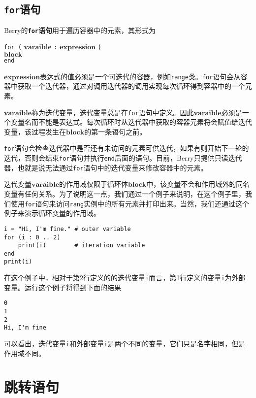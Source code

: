 \subsection{\texttt{for}语句}

Berry的\textbf{\texttt{for}语句}用于遍历容器中的元素，其形式为
\begin{algorithm}
    \texttt{for (} $\bm{varaible}$ \texttt{:} $\bm{expression}$ \texttt{)} \\
        \qquad $\bm{block}$ \\
    \texttt{end}
\end{algorithm}\vspace{-0.6em}

$\bm{expression}$表达式的值必须是一个可迭代的容器，例如\texttt{range}类。\texttt{for}语句会从容器中获取一个迭代器，通过对调用迭代器的调用实现每次循环得到容器中的一个元素。

$\bm{varaible}$称为迭代变量，迭代变量总是在\texttt{for}语句中定义。因此$\bm{varaible}$必须是一个变量名而不能是表达式。每次循环时从迭代器中获取的容器元素将会赋值给迭代变量，该过程发生在$\bm{block}$的第一条语句之前。

\texttt{for}语句会检查迭代器中是否还有未访问的元素可供迭代，如果有则开始下一轮的迭代，否则会结束\texttt{for}语句并执行\texttt{end}后面的语句。目前，Berry只提供只读迭代器，也就是说无法通过\texttt{for}语句中的迭代变量来修改容器中的元素。

迭代变量$\bm{varaible}$的作用域仅限于循环体$\bm{block}$中，该变量不会和作用域外的同名变量有任何关系。为了说明这一点，我们通过一个例子来说明，在这个例子里，我们使用\texttt{for}语句来访问\texttt{rang}实例中的所有元素并打印出来。当然，我们还通过这个例子来演示循环变量的作用域。
\begin{lstlisting}[language=berry]
i = "Hi, I'm fine." # outer variable
for (i : 0 .. 2)
    print(i)        # iteration variable
end
print(i)
\end{lstlisting}

在这个例子中，相对于第2行定义的的迭代变量\texttt{i}而言，第1行定义的变量\texttt{i}为外部变量。运行这个例子将得到下面的结果
\begin{lstlisting}[numbers=none]
0
1
2
Hi, I'm fine
\end{lstlisting}
可以看出，迭代变量\texttt{i}和外部变量\texttt{i}是两个不同的变量，它们只是名字相同，但是作用域不同。

\section{跳转语句}

